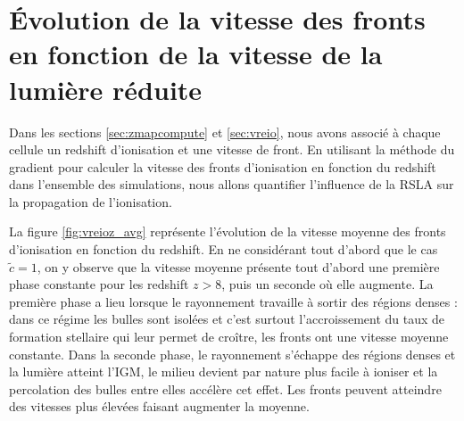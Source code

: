 


\section[Vitesse des fronts]{Évolution de la vitesse des fronts en fonction de la vitesse de la lumière réduite}
\label{sec:compfrontspeep}

Dans les sections \ref{sec:zmapcompute} et \ref{sec:vreio}, nous avons associé à chaque cellule un redshift d'ionisation et une vitesse de front.
En utilisant la méthode du gradient pour calculer la vitesse des fronts d'ionisation en fonction du redshift dans l'ensemble des simulations, nous allons quantifier l'influence de la \ac{RSLA} sur la propagation de l'ionisation.


La figure \ref{fig:vreioz_avg} représente l'évolution de la vitesse moyenne des fronts d'ionisation en fonction du redshift.
En ne considérant tout d'abord que le cas  $\tilde{c}=1$, on y observe que la vitesse moyenne présente tout d'abord une première phase constante pour les redshift $z>8$, puis un seconde où elle augmente.
La première phase a lieu lorsque le rayonnement travaille à sortir des régions denses : dans ce régime les bulles sont isolées et c'est surtout l'accroissement du taux de formation stellaire qui leur permet de croître, les fronts ont une vitesse moyenne constante.
Dans la seconde phase, le rayonnement s'échappe des régions denses et la lumière atteint l'\ac{IGM}, le milieu devient par nature plus facile à ioniser et la percolation des bulles entre elles accélère cet effet.
Les fronts peuvent atteindre des vitesses plus élevées faisant augmenter la moyenne.

